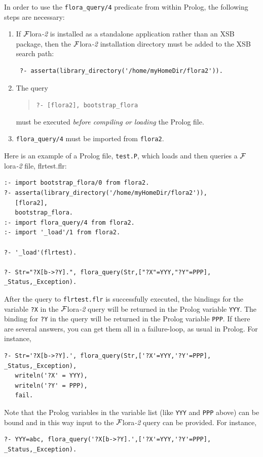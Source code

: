 \documentclass[11pt]{article}
\newcommand{\FLORA}{{\mbox{\sc ${\cal F}${lora}\rm\emph{-2}}}\xspace}
\begin{document}
In order to use the {\tt flora\_query/4} predicate from within Prolog,
the following steps are necessary:
\begin{enumerate}
  \item  If \FLORA is installed as a standalone application rather than an
    XSB package, then the \FLORA installation directory must be added to
    the XSB search path:
\begin{verbatim}
 ?- asserta(library_directory('/home/myHomeDir/flora2')).  
\end{verbatim}
  \item The query
    \begin{quote}
      {\tt ?- [flora2], bootstrap\_flora} 
    \end{quote}
    must be executed \emph{before compiling or loading} the Prolog file.
  \item {\tt flora\_query/4} must be imported from {\tt flora2}.  
\end{enumerate}
Here is an example of a Prolog file, {\tt test.P}, which loads and then
queries a \FLORA file, flrtest.flr:
\begin{verbatim}
:- import bootstrap_flora/0 from flora2.
?- asserta(library_directory('/home/myHomeDir/flora2')),
   [flora2],
   bootstrap_flora. 
:- import flora_query/4 from flora2.
:- import '_load'/1 from flora2.

?- '_load'(flrtest).  

?- Str="?X[b->?Y].", flora_query(Str,["?X"=YYY,"?Y"=PPP], _Status,_Exception).
\end{verbatim}
After the query to {\tt flrtest.flr} is successfully executed, the bindings
for the variable {\tt ?X} in the \FLORA query will be returned in the Prolog
variable {\tt YYY}. The binding  for {\tt ?Y} in the query will be returned in the
Prolog variable {\tt PPP}. If there are several answers, you can get them
all in a failure-loop, as usual in Prolog. For instance, 
\begin{verbatim}
?- Str='?X[b->?Y].', flora_query(Str,['?X'=YYY,'?Y'=PPP], _Status,_Exception),
   writeln('?X' = YYY),
   writeln('?Y' = PPP),
   fail.
\end{verbatim}
Note that the Prolog variables in the variable list (like {\tt YYY} and
{\tt PPP} above) can be bound and in this way input to the \FLORA query  
can be provided. For instance, 
\begin{verbatim}
?- YYY=abc, flora_query('?X[b->?Y].',['?X'=YYY,'?Y'=PPP], _Status,_Exception).
\end{verbatim}
\end{document}
